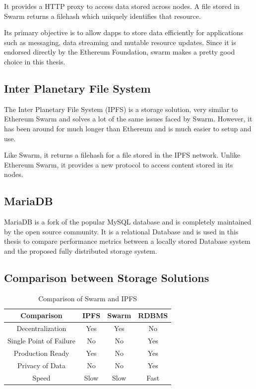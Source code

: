 \documentclass[11pt,openright]{report}
\begin{document}
It provides a HTTP proxy to access data stored across nodes. A file stored in Swarm returns a filehash which uniquely identifies that resource.

Its primary objective is to allow dapps to store data efficiently for applications such as messaging, data streaming and mutable resource updates. Since it is endorsed directly by the Ethereum Foundation, swarm makes a pretty good choice in this thesis.


\subsection{Inter Planetary File System}
The Inter Planetary File System (IPFS) \cite{ipfs2014} is a storage solution, very similar to Ethereum Swarm and solves a lot of the same issues faced by Swarm. However, it has been around for much longer than Ethereum and is much easier to setup and use.

Like Swarm, it returns a filehash for a file stored in the IPFS network. Unlike Ethereum Swarm, it provides a new protocol to access content stored in its nodes.

\subsection{MariaDB}
MariaDB is a fork of the popular MySQL database and is completely maintained by the open source community. It is a relational Database and is used in this thesis to compare performance metrics between a locally stored Database system and the proposed fully distributed storage system.

\subsection{Comparison between Storage Solutions}
\begin{table}[!htbp]
	\renewcommand{\arraystretch}{1.3}
	\caption{Comparison of Swarm and IPFS}
	\label{swarm_eth_comparison}
	\centering
	\begin{tabular}{|c||c|c|c|}
		\hline
		\bfseries Comparison & \bfseries IPFS & \bfseries Swarm & \bfseries RDBMS \\
		\hline\hline
		Decentralization & Yes & Yes & No \\ \hline
		Single Point of Failure & No & No & Yes \\ \hline
		Production Ready & Yes & No & Yes \\ \hline
		Privacy of Data & No & No & Yes \\ \hline
		Speed & Slow & Slow & Fast \\ \hline

	\end{tabular}
\end{table}
\end{document}
